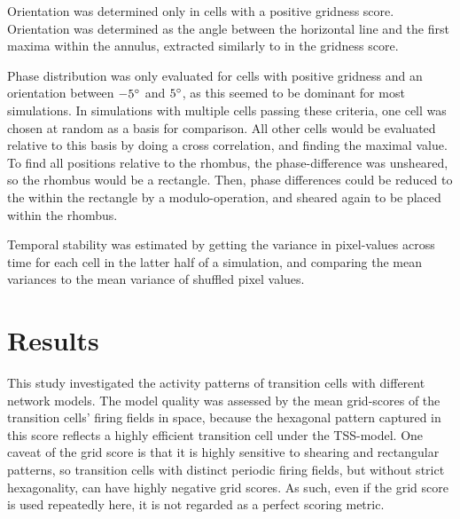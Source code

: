 \documentclass{article}
\begin{document}
    Orientation was determined only in cells with a positive gridness score. Orientation was determined as the angle between the horizontal line and the first maxima within the annulus, extracted similarly to in the gridness score.

    Phase distribution was only evaluated for cells with positive gridness and an orientation between \(-5\degree\) and \(5\degree\), as this seemed to be dominant for most simulations. In simulations with multiple cells passing these criteria, one cell was chosen at random as a basis for comparison. All other cells would be evaluated relative to this basis by doing a cross correlation, and finding the maximal value. To find all positions relative to the rhombus, the phase-difference was unsheared, so the rhombus would be a rectangle. Then, phase differences could be reduced to the within the rectangle by a modulo-operation, and sheared again to be placed within the rhombus.
    
    Temporal stability was estimated by getting the variance in pixel-values across time for each cell in the latter half of a simulation, and comparing the mean variances to the mean variance of shuffled pixel values. 


    \section{Results}

    This study investigated the activity patterns of transition cells with different network models. The model quality was assessed by the mean grid-scores of the transition cells' firing fields in space, because the hexagonal pattern captured in this score reflects a highly efficient transition cell under the TSS-model. One caveat of the grid score is that it is highly sensitive to shearing and rectangular patterns, so transition cells with distinct periodic firing fields, but without strict hexagonality, can have highly negative grid scores. As such, even if the grid score is used repeatedly here, it is not regarded as a perfect scoring metric.
\end{document}
